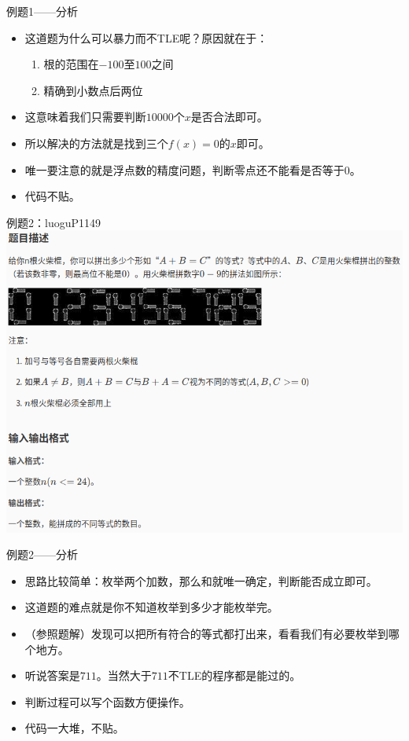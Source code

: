 \documentclass{beamer}[UTF-8]
\begin{document}
\begin{frame}{例题1——分析}
 \pause
\begin{itemize}
\item 这道题为什么可以暴力而不TLE呢？原因就在于： \pause
\begin{enumerate}
\item 根的范围在$-100$至$100$之间 \pause
\item 精确到小数点后两位 \pause
\end{enumerate}
\item 这意味着我们只需要判断$10000$个$x$是否合法即可。 \pause
\item 所以解决的方法就是找到三个$f(x)=0$的$x$即可。 \pause
\item 唯一要注意的就是浮点数的精度问题，判断零点还不能看是否等于$0$。 \pause
\item 代码不贴。
\end{itemize}
\end{frame}

\begin{frame}{例题2：luoguP1149}
\includegraphics{luoguP1149.png}
\end{frame}

\begin{frame}{例题2——分析}
 \pause
\begin{itemize}
\item 思路比较简单：枚举两个加数，那么和就唯一确定，判断能否成立即可。 \pause
\item 这道题的难点就是你不知道枚举到多少才能枚举完。 \pause
\item （参照题解）发现可以把所有符合的等式都打出来，看看我们有必要枚举到哪个地方。  \pause
\item 听说答案是$711$。当然大于$711$不TLE的程序都是能过的。 \pause
\item 判断过程可以写个函数方便操作。 \pause
\item 代码一大堆，不贴。
\end{itemize}
\end{frame}
\end{document}

